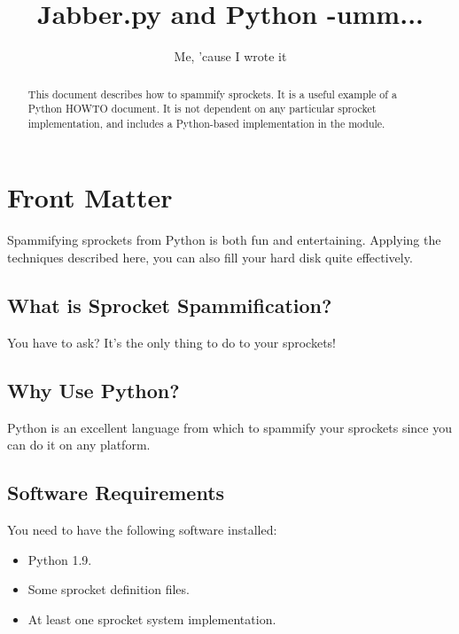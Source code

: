 \documentclass{howto}
\title{Jabber.py and Python -umm...}
\author{Me, 'cause I wrote it}
\begin{document}
\maketitle

%
\ifhtml
\chapter*{Front Matter\label{front}}
\fi


\begin{abstract}
\noindent
This document describes how to spammify sprockets.  It is a useful
example of a Python HOWTO document.  It is not dependent on any
particular sprocket implementation, and includes a Python-based
implementation in the  module.
\end{abstract}

\tableofcontents

Spammifying sprockets from Python is both fun and entertaining.
Applying the techniques described here, you can also fill your hard
disk quite effectively.

\section{What is Sprocket Spammification?}

You have to ask?  It's the only thing to do to your sprockets!


\section{Why Use Python?}

Python is an excellent language from which to spammify your sprockets
since you can do it on any platform.


\section{Software Requirements}

You need to have the following software installed:

\begin{itemize}
  \item  Python 1.9.
  \item  Some sprocket definition files.
  \item  At least one sprocket system implementation.
\end{itemize}
\end{document}
